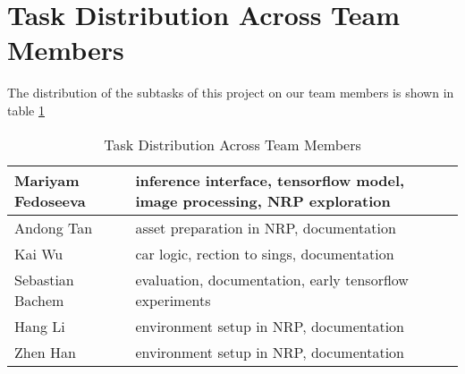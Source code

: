 \section{Task Distribution Across Team Members}

The distribution of the subtasks of this project on our team members is shown in table \ref{tab:task_distrubution}

\begin{table}[htpb]
    \caption[Task Distribution Across Team Members]{Task Distribution Across Team Members}
    \label{tab:task_distrubution}
    \centering
    \begin{tabular}{|l|l|}
    \hline
    Mariyam Fedoseeva   & inference interface, tensorflow model, image processing, NRP exploration \\
    \hline
    Andong Tan          & asset preparation in NRP, documentation \\
    \hline
    Kai Wu              & car logic, rection to sings, documentation \\
    \hline
    Sebastian Bachem    & evaluation, documentation, early tensorflow experiments \\
    \hline
    Hang Li             & environment setup in NRP, documentation \\
    \hline
    Zhen Han            & environment setup in NRP, documentation\\
    \hline
    \end{tabular}
\end{table}
